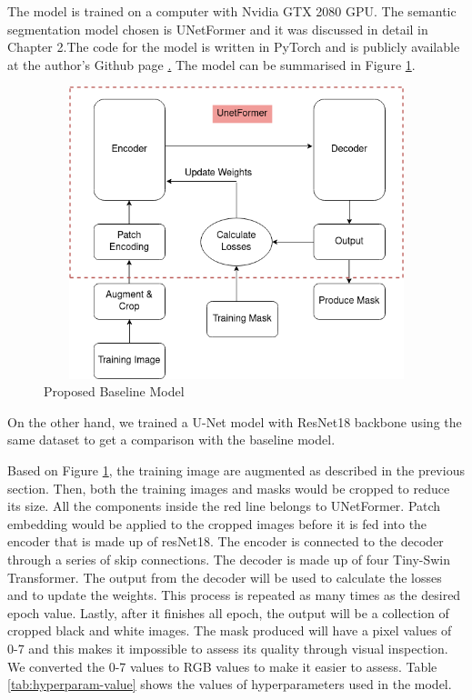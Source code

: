 The model is trained on a computer with Nvidia GTX 2080 GPU. The semantic segmentation model chosen is UNetFormer \cite{unetformer} and it was discussed in detail in Chapter 2.The code for the model is written in PyTorch and is publicly available at the author's Github page \href{https://github.com/WangLibo1995/GeoSeg}. The model can be summarised in Figure \ref{fig:initial-model}.

\FloatBarrier
\begin{figure}[!h]
\includegraphics[width=13.0cm, height=8.5cm]{images/initial model.png}
\caption{Proposed Baseline Model}
\label{fig:initial-model}
\end{figure}
\FloatBarrier
On the other hand, we trained a U-Net model with ResNet18 backbone using the same dataset to get a comparison with the baseline model. 

Based on Figure \ref{fig:initial-model}, the training image are augmented as described in the previous section. Then, both the training images and masks would be cropped to reduce its size. All the components inside the red line belongs to UNetFormer. Patch embedding would be applied to the cropped images before it is fed into the encoder that is made up of resNet18. The encoder is connected to the decoder through a series of skip connections. The decoder is made up of four Tiny-Swin Transformer. The output from the decoder will be used to calculate the losses and to update the weights. This process is repeated as many times as the desired epoch value. Lastly, after it finishes all epoch, the output will be a collection of cropped black and white images. The mask produced will have a pixel values of 0-7 and this makes it impossible to assess its quality through visual inspection. We converted the 0-7 values to RGB values to make it easier to assess. Table \ref{tab:hyperparam-value} shows the values of hyperparameters used in the model.

